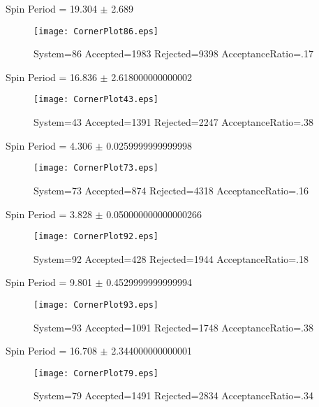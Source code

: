 \documentclass[10pt]{article}
\begin{document}
\newpage
\begin{center}
        Spin Period = 19.304 $\pm$ 2.689
        \end{center}
\begin{figure}[h] 
        \texttt{[image: CornerPlot86.eps]}
        \caption{System=86 Accepted=1983 Rejected=9398 AcceptanceRatio=.17}
        \label{S86}
        \centering
        \end{figure}
\newpage
\begin{center}
        Spin Period = 16.836 $\pm$ 2.618000000000002
        \end{center}
\begin{figure}[h] 
        \texttt{[image: CornerPlot43.eps]}
        \caption{System=43 Accepted=1391 Rejected=2247 AcceptanceRatio=.38}
        \label{S43}
        \centering
        \end{figure}
\newpage
\begin{center}
        Spin Period = 4.306 $\pm$ 0.0259999999999998
        \end{center}
\begin{figure}[h] 
        \texttt{[image: CornerPlot73.eps]}
        \caption{System=73 Accepted=874 Rejected=4318 AcceptanceRatio=.16}
        \label{S73}
        \centering
        \end{figure}
\newpage
\begin{center}
        Spin Period = 3.828 $\pm$ 0.050000000000000266
        \end{center}
\begin{figure}[h] 
        \texttt{[image: CornerPlot92.eps]}
        \caption{System=92 Accepted=428 Rejected=1944 AcceptanceRatio=.18}
        \label{S92}
        \centering
        \end{figure}
\newpage
\begin{center}
        Spin Period = 9.801 $\pm$ 0.4529999999999994
        \end{center}
\begin{figure}[h] 
        \texttt{[image: CornerPlot93.eps]}
        \caption{System=93 Accepted=1091 Rejected=1748 AcceptanceRatio=.38}
        \label{S93}
        \centering
        \end{figure}
\newpage
\begin{center}
        Spin Period = 16.708 $\pm$ 2.344000000000001
        \end{center}
\begin{figure}[h] 
        \texttt{[image: CornerPlot79.eps]}
        \caption{System=79 Accepted=1491 Rejected=2834 AcceptanceRatio=.34}
        \label{S79}
        \centering
        \end{figure}
\end{document}
